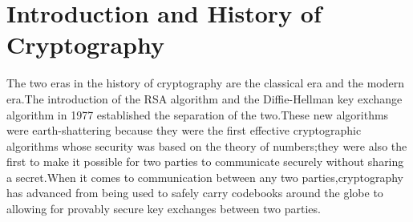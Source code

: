 \documentclass{article}
\begin{document}




\newpage
\section{Introduction and History of Cryptography}
The two eras in the history of cryptography are the classical era and the modern era.The introduction of the RSA algorithm and the Diffie-Hellman key exchange algorithm in 1977 established the separation of the two.These new algorithms were earth-shattering because they were the first effective cryptographic algorithms whose security was based on the theory of numbers;they were also the first to make it possible for two parties to communicate securely without sharing a secret.When it comes to communication between any two parties,cryptography has advanced from being used to safely carry codebooks around the globe to allowing for provably secure key exchanges between two parties.
\end{document}
